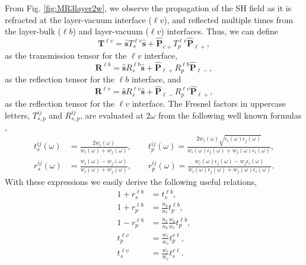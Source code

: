 \documentclass[aps,pra,10pt,amsmath,notitlepage,letterpaper]{revtex4-1}
\begin{document}
From Fig. \ref{fig:MR3layer2w}, we observe the propagation of the SH field as it
is refracted at the layer-vacuum interface ($\ell v$), and  reflected multiple
times from the layer-bulk ($\ell b$) and layer-vacuum ($\ell v$) interfaces.
Thus, we can define
\begin{equation}\label{eq:r5}
\mathbf{T}^{\ell v}
= \hat{\mathbf{s}}T_{s}^{\ell v}\hat{\mathbf{s}} 
+ \hat{\mathbf{P}}_{v+}T_{p}^{\ell v} \hat{\mathbf{P}}_{\ell +},
\end{equation}
as the transmission tensor for the $\ell v$ interface,
\begin{equation}\label{eq:r6}
\mathbf{R}^{\ell b}
= \hat{\mathbf{s}}R_{s}^{\ell b}\hat{\mathbf{s}}
+ \hat{\mathbf{P}}_{\ell +}R_{p}^{\ell b} \hat{\mathbf{P}}_{\ell -},
\end{equation} 
as the reflection tensor for the $\ell b$ interface, and
\begin{equation}\label{eq:r6b}
\mathbf{R}^{\ell v}
= \hat{\mathbf{s}}R_{s}^{\ell v}\hat{\mathbf{s}}
+ \hat{\mathbf{P}}_{\ell -}R_{p}^{\ell v} \hat{\mathbf{P}}_{\ell +},
\end{equation} 
as the reflection tensor for the $\ell v$ interface. The Fresnel factors in
uppercase letters, $T^{ij}_{s,p}$ and $R^{ij}_{s,p}$, are evaluated at $2\omega$
from the following well known formulas \cite{jacksonbook},
\begin{equation}\label{eq:e.f1}
\begin{split}
t_{s}^{ij}(\omega) &=
\frac{2w_{i}(\omega)}{w_{i}(\omega) + w_{j}(\omega)},
\quad\quad  
t_{p}^{ij}(\omega) =
\frac{2w_{i}(\omega)\sqrt{\epsilon_{i}(\omega)\epsilon_j(\omega)}}
     {w_{i}(\omega)\epsilon_{j}(\omega) + w_{j}(\omega)\epsilon_{i}(\omega)},\\
r_{s}^{ij}(\omega) &=
\frac{w_{i}(\omega) - w_{j}(\omega)}
     {w_{i}(\omega) + w_{j}(\omega)},
\quad\quad 
r_{p}^{ij}(\omega) =
\frac{w_{i}(\omega)\epsilon_{j}(\omega) - w_{j}\epsilon_{i}(\omega)}
     {w_{i}(\omega)\epsilon_{j}(\omega) + w_{j}(\omega)\epsilon_{i}(\omega)}. 
\end{split}
\end{equation}
With these expressions we easily derive the following useful relations,
\begin{equation}\label{eq:mf}
\begin{split}
1 + r^{\ell b}_{s} &= t^{\ell b}_{s},\\
1 + r^{\ell b}_{p} &= \frac{n_{b}}{n_{\ell}}t^{\ell b}_{p},\\
1 - r^{\ell b}_{p} &= \frac{n_{\ell}}{n_{b}}\frac{w_{b}}{w_{\ell}}
                      t^{\ell b}_{p},\\
t^{\ell v}_{p} &= \frac{w_{\ell}}{w_{v}}t^{v\ell}_{p},\\
t^{\ell v}_{s} &= \frac{w_{\ell}}{w_{v}}t^{v\ell}_{s}.
\end{split}
\end{equation}
\end{document}

